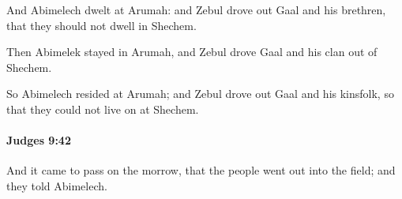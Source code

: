 			\begin{versebox}
					\item[BHS] 
					\item[ASV] And Abimelech dwelt at Arumah: and Zebul drove out Gaal and his brethren, that they should not dwell in Shechem.
					\item[NIV] Then Abimelek stayed in Arumah, and Zebul drove Gaal and his clan out of Shechem.
					\item[NRSV] So Abimelech resided at Arumah; and Zebul drove out Gaal and his kinsfolk, so that they could not live on at Shechem.
			\end{versebox}

		\paragraph{Judges 9:42} %
			\label{JUDGES-9-42}

			And it came to pass on the morrow, that the people went out into the field; and they told Abimelech.

